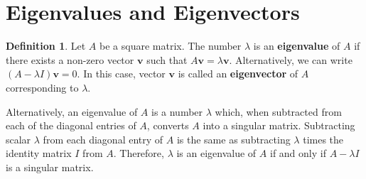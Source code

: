 \documentclass[12pt]{article}
\renewcommand{\vec}[1]{\mathbf{#1}}
\theoremstyle{definition}
\newtheorem{definition}{Definition}
\begin{document}
\maketitle
\onehalfspace



\section{Eigenvalues and Eigenvectors}

\begin{definition}
	Let $A$ be a square matrix. The number $\lambda $ is an \textbf{eigenvalue} of $A$ if there exists a non-zero vector $\vec{v}$ such that $A\vec{v} = \lambda  \vec{v}$. Alternatively, we can write $(A - \lambda I)\vec{v}=0$. In this case, vector $\vec{v}$ is called an \textbf{eigenvector} of $A$ corresponding to $\lambda $.
\end{definition}

Alternatively, an eigenvalue of $A$ is a number $\lambda $ which, when subtracted from each of the diagonal entries of $A$, converts $A$ into a singular matrix. Subtracting scalar $\lambda $ from each diagonal entry of $A$ is the same as subtracting $\lambda $ times the identity matrix $I$ from $A$. Therefore, $\lambda$ is an eigenvalue of $A$ if and only if $A - \lambda I$ is a singular matrix.
\end{document}
